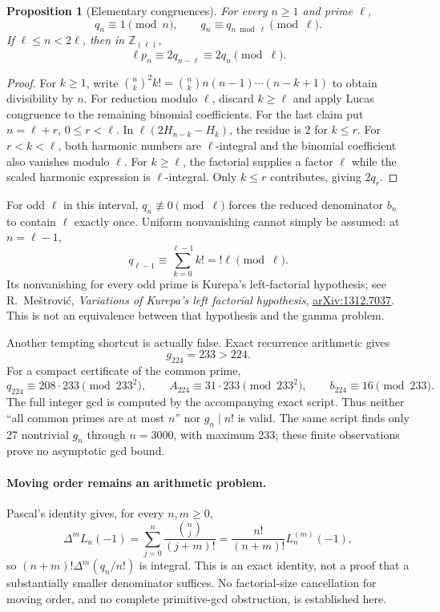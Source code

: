 \documentclass[11pt,a4paper]{article}
\newtheorem{proposition}[theorem]{Proposition}
\theoremstyle{definition}
\theoremstyle{remark}
\theoremstyle{plain}
\numberwithin{equation}{section}
\begin{document}
\begin{proposition}[Elementary congruences]
For every $n\ge1$ and prime $\ell$,
\[
 q_n\equiv1\pmod n,\qquad
 q_n\equiv q_{n\bmod\ell}\pmod\ell.
\]
If $\ell\le n<2\ell$, then in $\mathbb Z_{(\ell)}$,
\[
 \ell p_n\equiv2q_{n-\ell}\equiv2q_n\pmod\ell.
\]
\end{proposition}

\begin{proof}
For $k\ge1$, write
$\binom nk^2k!=\binom nk n(n-1)\cdots(n-k+1)$ to obtain divisibility
by $n$.  For reduction modulo $\ell$, discard $k\ge\ell$ and apply
Lucas congruence to the remaining binomial coefficients.
For the last claim put $n=\ell+r$, $0\le r<\ell$.  In
$\ell(2H_{n-k}-H_k)$, the residue is $2$ for $k\le r$.
For $r<k<\ell$, both harmonic numbers are $\ell$-integral and the
binomial coefficient also vanishes modulo $\ell$.
For $k\ge\ell$, the factorial supplies a factor $\ell$ while the
scaled harmonic expression is $\ell$-integral.  Only $k\le r$
contributes, giving $2q_r$.
\end{proof}

For odd $\ell$ in this interval, $q_n\not\equiv0\pmod\ell$ forces
the reduced denominator $b_n$ to contain $\ell$ exactly once.
Uniform nonvanishing cannot simply be assumed: at $n=\ell-1$,
\[
 q_{\ell-1}\equiv\sum_{k=0}^{\ell-1}k!=!\ell\pmod\ell.
\]
Its nonvanishing for every odd prime is Kurepa's left-factorial
hypothesis; see R.~Me\v strovi\'c,
\emph{Variations of Kurepa's left factorial hypothesis},
\href{https://arxiv.org/abs/1312.7037}{arXiv:1312.7037}.
This is not an equivalence between that hypothesis and the gamma
problem.

Another tempting shortcut is actually false. Exact recurrence
arithmetic gives
\[
 \boxed{g_{224}=233>224.}
\]
For a compact certificate of the common prime,
\[
 q_{224}\equiv208\cdot233\pmod{233^2},\qquad
 A_{224}\equiv31\cdot233\pmod{233^2},\qquad
 b_{224}\equiv16\pmod{233}.
\]
The full integer gcd is computed by the accompanying exact script.
Thus neither ``all common primes are at most $n$'' nor $g_n\mid n!$
is valid.  The same script finds only 27 nontrivial $g_n$ through
$n=3000$, with maximum 233; these finite observations prove no
asymptotic gcd bound.

\paragraph{Moving order remains an arithmetic problem.}
Pascal's identity gives, for every $n,m\ge0$,
\[
 \Delta^m L_n(-1)=\sum_{j=0}^n\frac{\binom nj}{(j+m)!}
 =\frac{n!}{(n+m)!}L_n^{(m)}(-1),
\]
so $(n+m)!\Delta^m(q_n/n!)$ is integral.  This is an exact
identity, not a proof that a substantially smaller denominator
suffices.  No factorial-size cancellation for moving order, and no
complete primitive-gcd obstruction, is established here.
\end{document}

